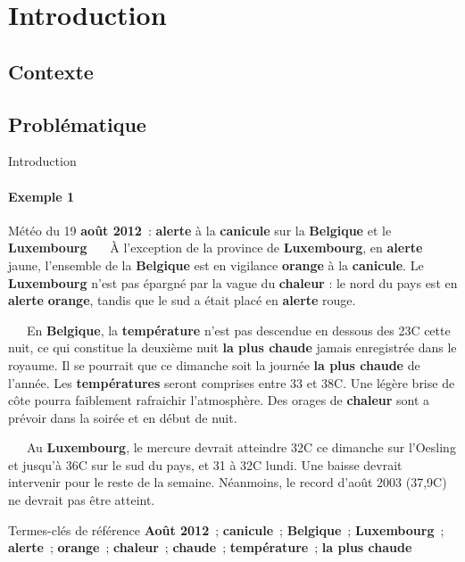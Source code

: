 \section*{Introduction}
  \subsection*{Contexte}
    

  \subsection*{Problématique}
    

  \begin{frame}{Introduction}\framesubtitle{Exemple 1}
    \begin{exampleblock}{\small
      Météo du 19 \textbf{août 2012}~: \textbf{alerte} à la
      \textbf{canicule} sur la \textbf{Belgique} et le
      \textbf{Luxembourg}
    }\justifying\small
      ~~~À l'exception de la province de \textbf{Luxembourg}, en
      \textbf{alerte} jaune, l'ensemble de la \textbf{Belgique} est en
      vigilance \textbf{orange} à la \textbf{canicule}. Le
      \textbf{Luxembourg} n'est pas épargné par la vague du \textbf{chaleur}
      : le nord du pays est en \textbf{alerte} \textbf{orange}, tandis que
      le sud a était placé en \textbf{alerte} rouge.

      ~~~En \textbf{Belgique}, la \textbf{température} n'est pas descendue
      en dessous des 23\degre{}C cette nuit, ce qui constitue la deuxième nuit
      \textbf{la plus chaude} jamais enregistrée dans le royaume. Il se
      pourrait que ce dimanche soit la journée \textbf{la plus chaude} de
      l'année. Les \textbf{températures} seront comprises entre 33 et
      38\degre{}C. Une légère brise de côte pourra faiblement rafraichir
      l'atmosphère. Des orages de \textbf{chaleur} sont a prévoir dans la
      soirée et en début de nuit.

      ~~~Au \textbf{Luxembourg}, le mercure devrait atteindre 32\degre{}C ce
      dimanche sur l'Oesling et jusqu'à 36\degre{}C sur le sud du pays, et 31 à
      32\degre{}C lundi. Une baisse devrait intervenir pour le reste de la
      semaine. Néanmoins, le record d'août 2003 (37,9\degre{}C) ne devrait pas
      être atteint.

      \begin{exampleblock}{\small Termes-clés de référence}\justifying\small
        \textbf{Août 2012}~; \textbf{canicule}~;
        \textbf{Belgique}~; \textbf{Luxembourg}~; \textbf{alerte}~;
        \textbf{orange}~; \textbf{chaleur}~; \textbf{chaude}~;
        \textbf{température}~; \textbf{la plus chaude}
      \end{exampleblock}
    \end{exampleblock}
  \end{frame}

